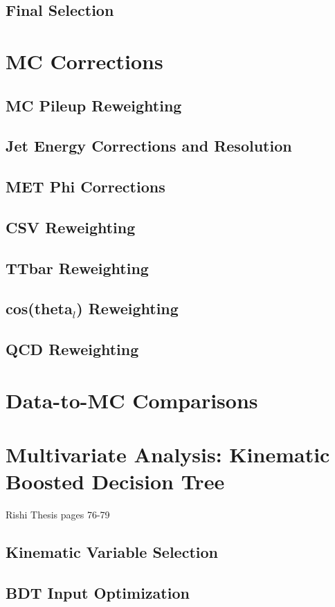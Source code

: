 \subsection{Final Selection}

\section{MC Corrections}
\subsection{MC Pileup Reweighting}
\subsection{Jet Energy Corrections and Resolution}
\subsection{MET Phi Corrections}
\subsection{CSV Reweighting}
\subsection{TTbar Reweighting}
\subsection{cos(theta$_l$) Reweighting}
\subsection{QCD Reweighting}

\section{Data-to-MC Comparisons}

\section{Multivariate Analysis: Kinematic Boosted Decision Tree}
Rishi Thesis pages 76-79
\subsection{Kinematic Variable Selection}
\subsection{BDT Input Optimization}
